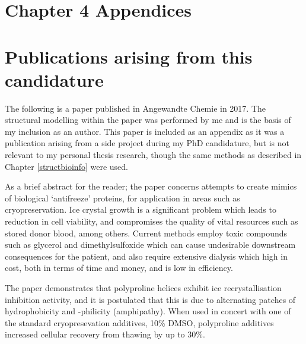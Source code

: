 \documentclass[a4paper, oneside, 11pt]{report} %
\begin{document}
\begin{appendices}

\chapter{Chapter 4 Appendices}\label{bioinformatics_appendix}
%
%
%
%

\chapter{Publications arising from this candidature}\label{publications}
The following is a paper published in Angewandte Chemie in 2017. The structural modelling within the paper was performed by me and is the basis of my inclusion as an author. This paper is included as an appendix as it was a publication arising from a side project during my PhD candidature, but is not relevant to my personal thesis research, though the same methods as described in Chapter \ref{structbioinfo} were used.

As a brief abstract for the reader; the paper concerns attempts to create mimics of biological `antifreeze' proteins, for application in areas such as cryopreservation. Ice crystal growth is a significant problem which leads to reduction in cell viability, and compromises the quality of vital resources such as stored donor blood, among others. Current methods employ toxic compounds such as glycerol and dimethylsulfoxide which can cause undesirable downstream consequences for the patient, and also require extensive dialysis which high in cost, both in terms of time and money, and is low in efficiency.

The paper demonstrates that polyproline helices exhibit ice recrystallisation inhibition activity, and it is postulated that this is due to alternating patches of hydrophobicity and -philicity (amphipathy). When used in concert with one of the standard cryopresevation additives, 10\% DMSO, polyproline additives increased cellular recovery from thawing by up to 30\%.



\end{appendices}
\end{document}
